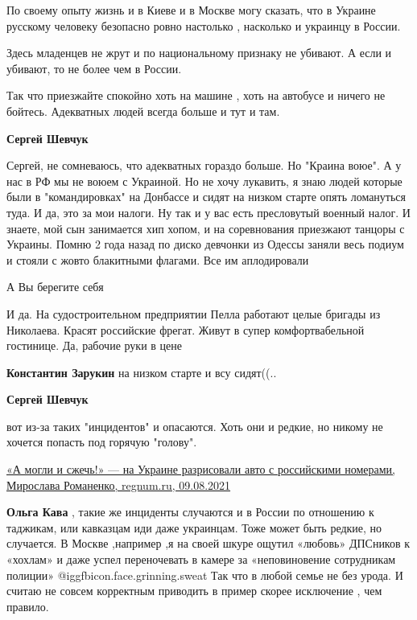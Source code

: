 \begin{itemize}
\begin{itemize}
По своему опыту жизнь и в Киеве и в Москве могу сказать, что в Украине русскому
человеку безопасно ровно настолько , насколько и украинцу в России.

Здесь младенцев не жрут и по национальному признаку не убивают. А если и
убивают, то не более чем в России.

Так что приезжайте спокойно хоть на машине , хоть на автобусе и ничего не
бойтесь. Адекватных людей всегда больше и тут и там.

\textbf{Сергей Шевчук} 

Сергей, не сомневаюсь, что адекватных гораздо больше. Но "Краина воюе". А у нас
в РФ мы не воюем с Украиной. Но не хочу лукавить, я знаю людей которые были в
"командировках" на Донбассе и сидят на низком старте опять ломануться туда. И
да, это за мои налоги. Ну так и у вас есть пресловутый военный налог. И знаете,
мой сын занимается хип хопом, и на соревнования приезжают танцоры с Украины.
Помню 2 года назад по диско девчонки из Одессы заняли весь подиум и стояли с
жовто блакитными флагами. Все им аплодировали

А Вы берегите себя


И да. На судостроительном предприятии Пелла работают целые бригады из
Николаева. Красят российские фрегат. Живут в супер комфортвабельной гостинице.
Да, рабочие руки в цене


\textbf{Константин Зарукин} на низком старте и всу сидят((..

\textbf{Сергей Шевчук} 

вот из-за таких "инцидентов" и опасаются. Хоть они и редкие, но никому не
хочется попасть под горячую "голову". 

\href{https://regnum.ru/news/3340291.html}{%
«А могли и сжечь!» — на Украине разрисовали авто с российскими номерами, %
Мирослава Романенко, regnum.ru, 09.08.2021%
}

\textbf{Ольга Кава} , такие же инциденты случаются и в России по отношению к таджикам, или кавказцам иди даже украинцам. Тоже может быть редкие, но случается. В Москве ,например ,я на своей шкуре ощутил «любовь» ДПСников к «хохлам» и даже успел переночевать в камере за «неповиновение сотрудникам полиции»  @igg{fbicon.face.grinning.sweat} 
Так что в любой семье не без урода. И считаю не совсем корректным приводить в пример скорее исключение , чем правило.


\end{itemize}
\end{itemize}
